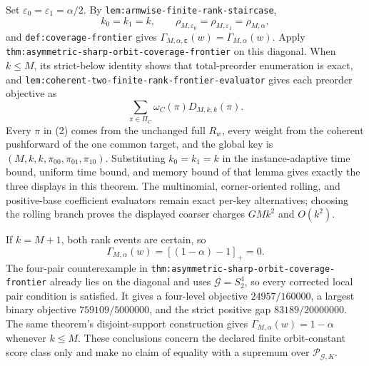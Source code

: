 Set \(\varepsilon_0=\varepsilon_1=\alpha/2\). By \texttt{lem:armwise-finite-rank-staircase},
\[
k_0=k_1=k,\qquad \rho_{M,\varepsilon_0}=\rho_{M,\varepsilon_1}=\rho_{M,\alpha},
\tag{1}
\]
and \texttt{def:coverage-frontier} gives \(\Gamma_{M,\alpha,\boldsymbol\varepsilon}(w)=\Gamma_{M,\alpha}(w)\). Apply \texttt{thm:asymmetric-sharp-orbit-coverage-frontier} on this diagonal. When \(k\le M\), its strict-below identity shows that total-preorder enumeration is exact, and \texttt{lem:coherent-two-finite-rank-frontier-evaluator} gives each preorder objective as
\[
\sum_{\pi\in\Pi_C}\omega_C(\pi)D_{M,k,k}(\pi).
\tag{2}
\]
Every \(\pi\) in (2) comes from the unchanged full \(R_w\), every weight from the coherent pushforward of the one common target, and the global key is \((M,k,k,\pi_{00},\pi_{01},\pi_{10})\). Substituting \(k_0=k_1=k\) in the instance-adaptive time bound, uniform time bound, and memory bound of that lemma gives exactly the three displays in this theorem. The multinomial, corner-oriented rolling, and positive-base coefficient evaluators remain exact per-key alternatives; choosing the rolling branch proves the displayed coarser charges \(GMk^2\) and \(O(k^2)\).

If \(k=M+1\), both rank events are certain, so
\[
\Gamma_{M,\alpha}(w)=[(1-\alpha)-1]_+=0.
\tag{3}
\]
The four-pair counterexample in \texttt{thm:asymmetric-sharp-orbit-coverage-frontier} already lies on the diagonal and uses \(\mathcal G=S_2^4\), so every corrected local pair condition is satisfied. It gives a four-level objective \(24957/160000\), a largest binary objective \(759109/5000000\), and the strict positive gap \(83189/20000000\). The same theorem's disjoint-support construction gives \(\Gamma_{M,\alpha}(w)=1-\alpha\) whenever \(k\le M\). These conclusions concern the declared finite orbit-constant score class only and make no claim of equality with a supremum over \(\mathcal P_{\mathcal G,K}\).